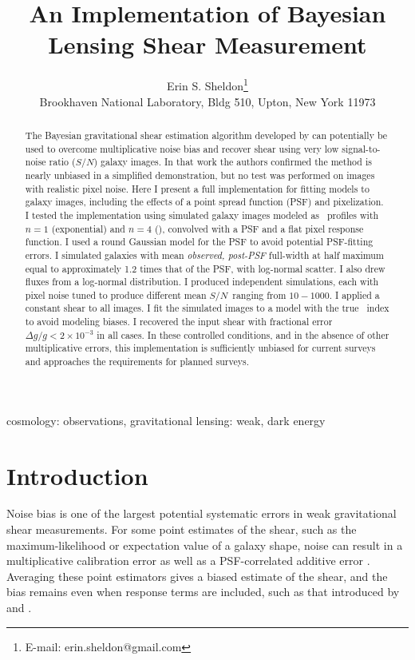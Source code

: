 \documentclass[usegraphicx,usenatbib]{mn2e}
\title{An Implementation of Bayesian Lensing Shear Measurement}
\author[Erin S. Sheldon]{Erin S. Sheldon\thanks{E-mail: erin.sheldon@gmail.com}\\
Brookhaven National Laboratory, Bldg 510, Upton, New York 11973}
\newcommand{\sn}{$S/N$}
\begin{document}
\maketitle

\begin{abstract}

The Bayesian gravitational shear estimation algorithm developed by \cite{ba14}
can potentially be used to overcome multiplicative noise bias and recover shear
using very low signal-to-noise ratio (\sn) galaxy images.  In that work the
authors confirmed the method is nearly unbiased in a simplified demonstration,
but no test was performed on images with realistic pixel noise.  Here I present
a full implementation for fitting models to galaxy images, including the
effects of a point spread function (PSF) and pixelization.  I tested the
implementation using simulated galaxy images modeled as \sersic\ profiles with
$n=1$ (exponential) and $n=4$ (\devauc), convolved with a PSF and a flat pixel
response function.  I used a round Gaussian model for the PSF to avoid
potential PSF-fitting errors. I simulated galaxies with mean {\em observed,
post-PSF} full-width at half maximum equal to approximately 1.2 times that of
the PSF, with log-normal scatter.  I also drew fluxes from a log-normal
distribution. I produced independent simulations, each with pixel noise tuned
to produce different mean \sn\ ranging from $10-1000$.  I applied a constant
shear to all images.  I fit the simulated images to a model with the true
\sersic\ index to avoid modeling biases.  I recovered the input shear with
fractional error $\Delta g/g < 2 \times 10^{-3}$ in all cases.  In these
controlled conditions, and in the absence of other multiplicative errors, this
implementation is sufficiently unbiased for current surveys and approaches the
requirements for planned surveys.

\end{abstract}


\begin{keywords}                                                                    
    cosmology: observations,
    gravitational lensing: weak,
    dark energy
\end{keywords} 

\section{Introduction} \label{sec:intro}


Noise bias is one of the largest potential systematic errors in weak
gravitational shear measurements.  For some point estimates of the shear,
such as the maximum-likelihood or expectation value of a galaxy shape, noise can
result in a multiplicative calibration error as well as a PSF-correlated
additive error \citep{HirataAlign04,Refreg12,Melchior12,Miller13}.  Averaging
these point estimators gives a biased estimate of the shear, and the bias
remains even when response terms are included, such as that introduced by
\cite{ksb95} and \cite{Bern02}.
\end{document}
